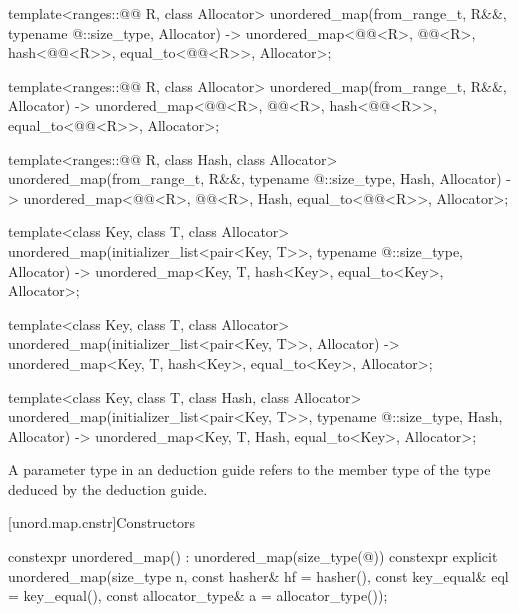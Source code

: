\begin{codeblock}
{  template<ranges::@@ R, class Allocator>
    unordered_map(from_range_t, R&&, typename @\seebelow@::size_type, Allocator)
      -> unordered_map<@@<R>, @@<R>, hash<@@<R>>,
                       equal_to<@@<R>>, Allocator>;

  template<ranges::@@ R, class Allocator>
    unordered_map(from_range_t, R&&, Allocator)
      -> unordered_map<@@<R>, @@<R>, hash<@@<R>>,
                       equal_to<@@<R>>, Allocator>;

  template<ranges::@@ R, class Hash, class Allocator>
    unordered_map(from_range_t, R&&, typename @\seebelow@::size_type, Hash, Allocator)
      -> unordered_map<@@<R>, @@<R>, Hash,
                       equal_to<@@<R>>, Allocator>;

  template<class Key, class T, class Allocator>
    unordered_map(initializer_list<pair<Key, T>>, typename @\seebelow@::size_type,
                  Allocator)
      -> unordered_map<Key, T, hash<Key>, equal_to<Key>, Allocator>;

  template<class Key, class T, class Allocator>
    unordered_map(initializer_list<pair<Key, T>>, Allocator)
      -> unordered_map<Key, T, hash<Key>, equal_to<Key>, Allocator>;

  template<class Key, class T, class Hash, class Allocator>
    unordered_map(initializer_list<pair<Key, T>>, typename @\seebelow@::size_type, Hash,
                  Allocator)
      -> unordered_map<Key, T, Hash, equal_to<Key>, Allocator>;
}
\end{codeblock}

\pnum
A  parameter type in an  deduction guide
refers to the  member type of the type deduced by the deduction guide.

[unord.map.cnstr]{Constructors}

%
\begin{itemdecl}
constexpr unordered_map() : unordered_map(size_type(@\seebelow@)) { }
constexpr explicit unordered_map(size_type n, const hasher& hf = hasher(),
                                 const key_equal& eql = key_equal(),
                                 const allocator_type& a = allocator_type());
\end{itemdecl}

